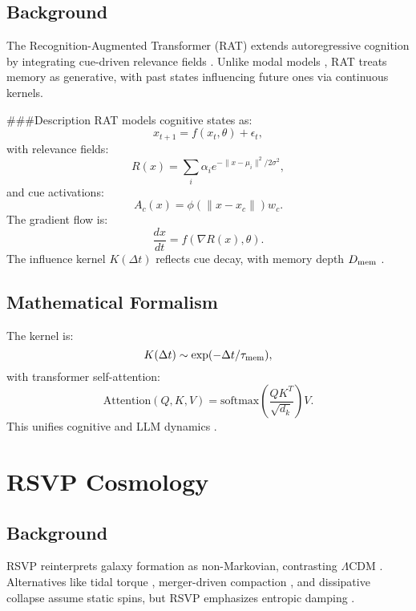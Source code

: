 \documentclass[12pt]{article}
\begin{document}
\subsection{Background}
The Recognition-Augmented Transformer (RAT) extends autoregressive cognition by integrating cue-driven relevance fields \citep{Barenholtz2025}. Unlike modal models \citep{AtkinsonShiffrin1968}, RAT treats memory as generative, with past states influencing future ones via continuous kernels.

###{Description}
RAT models cognitive states as:
\begin{equation}
x_{t+1} = f(x_t, \theta) + \epsilon_t,
\end{equation}
with relevance fields:
\begin{equation}
R(x) = \sum_i \alpha_i e^{-\|x - \mu_i\|^2 / 2\sigma^2},
\end{equation}
and cue activations:
\begin{equation}
A_c(x) = \phi(\|x - x_c\|) w_c.
\end{equation}
The gradient flow is:
\begin{equation}
\frac{dx}{dt} = f(\nabla R(x), \theta).
\end{equation}
The influence kernel $K(\Delta t)$ reflects cue decay, with memory depth $D_{\rm mem}$ \citep{Barenholtz2025}.

\subsection{Mathematical Formalism}
The kernel is:
\begin{equation}
K(\Delta t) \sim \exp(-\Delta t / \tau_{\rm mem}),
\end{equation}
with transformer self-attention:
\begin{equation}
\text{Attention}(Q,K,V) = \text{softmax}\left(\frac{QK^T}{\sqrt{d_k}}\right)V.
\end{equation}
This unifies cognitive and LLM dynamics \citep{Barenholtz2025}.

\section{RSVP Cosmology}
\label{sec:rsvp_lrd}
\subsection{Background}
RSVP reinterprets galaxy formation as non-Markovian, contrasting $\Lambda$CDM \citep{MoMaoWhite1998}. Alternatives like tidal torque \citep{EisensteinLoeb1995}, merger-driven compaction \citep{Zhuang2025}, and dissipative collapse \citep{BarkanaLoeb2001} assume static spins, but RSVP emphasizes entropic damping \citep{PacucciLoeb2025}.
\end{document}
